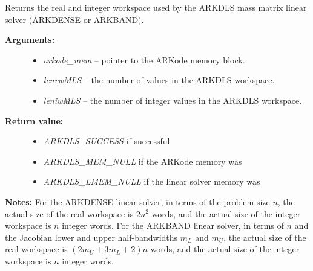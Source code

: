 \documentclass[letterpaper,10pt,english]{sphinxmanual}
\begin{document}
\begin{fulllineitems}
\label{c_interface/User_callable:ARKDlsGetMassWorkSpace}
Returns the real and integer workspace used by the
ARKDLS mass matrix linear solver (ARKDENSE or ARKBAND).
\begin{description}
\item[{\textbf{Arguments:}}] \leavevmode\begin{itemize}
\item {} 
\emph{arkode\_mem} -- pointer to the ARKode memory block.

\item {} 
\emph{lenrwMLS} -- the number of  values in the ARKDLS workspace.

\item {} 
\emph{leniwMLS} -- the number of integer values in the ARKDLS workspace.

\end{itemize}

\item[{\textbf{Return value:}}] \leavevmode\begin{itemize}
\item {} 
\emph{ARKDLS\_SUCCESS} if successful

\item {} 
\emph{ARKDLS\_MEM\_NULL} if the ARKode memory was 

\item {} 
\emph{ARKDLS\_LMEM\_NULL} if the linear solver memory was 

\end{itemize}

\end{description}

\textbf{Notes:} For the ARKDENSE linear solver, in terms of the problem
size $n$, the actual size of the real workspace is
$2n^2$  words, and the actual size of the integer
workspace is $n$ integer words. For the ARKBAND linear
solver, in terms of $n$ and the Jacobian lower and upper
half-bandwidths $m_L$ and $m_U$, the actual size of the
real workspace is $(2m_U + 3m_L + 2)n$  words,
and the actual size of the integer workspace is $n$ integer
words.

\end{fulllineitems}

\end{document}

